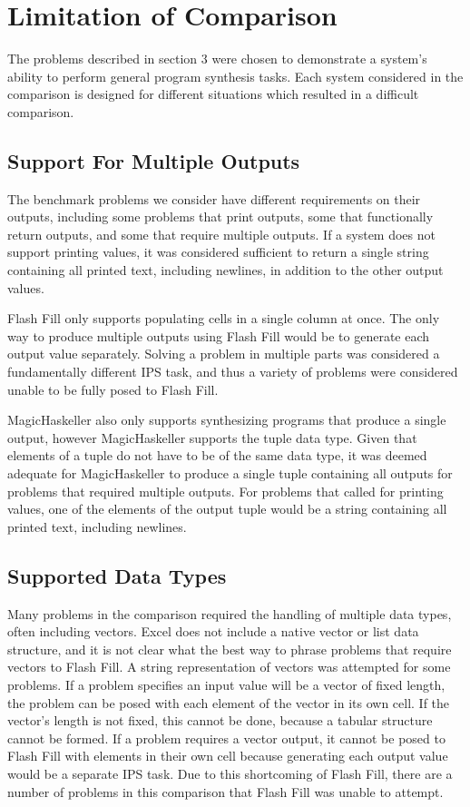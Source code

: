 \section{Limitation of Comparison}

The problems described in section 3 were chosen to demonstrate a system's ability to perform general program synthesis tasks. Each system considered in the comparison is designed for different situations which resulted in a difficult comparison.

\subsection{Support For Multiple Outputs}

The benchmark problems we consider have different requirements on their outputs, including some problems that print outputs, some that functionally return outputs, and some that require multiple outputs. If a system does not support printing values, it was considered sufficient to return a single string containing all printed text, including newlines, in addition to the other output values.

Flash Fill only supports populating cells in a single column at once. The only way to produce multiple outputs using Flash Fill would be to generate each output value separately. Solving a problem in multiple parts was considered a fundamentally different IPS task, and thus a variety of problems were considered unable to be fully posed to Flash Fill.

MagicHaskeller also only supports synthesizing programs that produce a single output, however MagicHaskeller supports the tuple data type. Given that elements of a tuple do not have to be of the same data type, it was deemed adequate for MagicHaskeller to produce a single tuple containing all outputs for problems that required multiple outputs. For problems that called for printing values, one of the elements of the output tuple would be a string containing all printed text, including newlines.

\subsection{Supported Data Types}

Many problems in the comparison required the handling of multiple data types, often including vectors.  Excel does not include a native vector or list data structure, and it is not clear what the best way to phrase problems that require vectors to Flash Fill. A string representation of vectors was attempted for some problems. If a problem specifies an input value will be a vector of fixed length, the problem can be posed with each element of the vector in its own cell. If the vector's length is not fixed, this cannot be done, because a tabular structure cannot be formed. If a problem requires a vector output, it cannot be posed to Flash Fill with elements in their own cell because generating each output value would be a separate IPS task. Due to this shortcoming of Flash Fill, there are a number of problems in this comparison that Flash Fill was unable to attempt.

